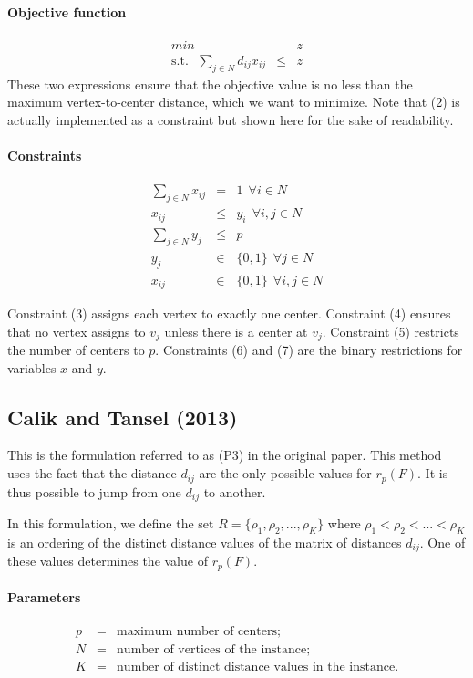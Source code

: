 \documentclass[a4paper,10pt]{article}
\begin{document}
	\paragraph{Objective function}
	\begin{eqnarray}
		min && z\\
		\text{s.t.}~~~ \sum_{j \in N} d_{ij} x_{ij} &\leq& z \label{eq:2}
	\end{eqnarray}
	These two expressions ensure that the objective value is no less than the maximum vertex-to-center distance, which we want to minimize. Note that (2) is actually implemented as a constraint but shown here for the sake of readability.
	
	\paragraph{Constraints}
	\begin{eqnarray}
		\sum_{j \in N} x_{ij} &=& 1 ~~\forall i \in N \\
		x_{ij} &\leq& y_i ~~\forall i,j \in N \\
		\sum_{j \in N} y_j &\leq& p \\
		y_j &\in& \{ 0,1 \} ~~\forall j \in N \\
		x_{ij} &\in& \{0 , 1 \} ~~\forall i,j \in N 
	\end{eqnarray}
	
	Constraint (3) assigns each vertex to exactly one center.
	Constraint (4) ensures that no vertex assigns to $v_j$ unless there is a center at $v_j$. 
	Constraint (5) restricts the number of centers to $p$.
	Constraints (6) and (7) are the binary restrictions for variables $x$ and $y$.     
    
    \subsection{Calik and Tansel (2013)}
	This is the formulation referred to as (P3) in the original paper. This method uses the fact that the distance $d_{ij}$ are the only possible values for $r_p(F)$. It is thus possible to jump from one $d_{ij}$ to another.
	
	In this formulation, we define the set $ R = \{ \rho_1, \rho_2, ..., \rho_K \}$ where $\rho_1 < \rho_2 < ... < \rho_K$ is an ordering of the distinct distance values of the matrix of distances $d_{ij}$. One of these values determines the value of $r_p(F)$.
	
	\paragraph{Parameters} 
	\begin{eqnarray*}
		p &=& \text{maximum number of centers;} \\
		N &=& \text{number of vertices of the instance;} \\
		K &=& \text{number of distinct distance values in the instance.}
	\end{eqnarray*}
	
\end{document}

